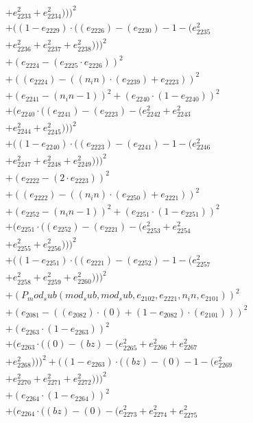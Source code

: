 \documentclass[10pt, a4paper]{article}
\begin{document}
\begin{small}
\begin{align*}
& + e_{2233}^{2} + e_{2234}^{2})))^{2} \\
& + ((1 - e_{2229})  \cdot  ((e_{2226}) - (e_{2230}) - 1 - (e_{2235}^{2} \\
& + e_{2236}^{2} + e_{2237}^{2} + e_{2238}^{2})))^{2} \\
& + (e_{2224} - (e_{2225}  \cdot  e_{2226}))^{2} \\
& + ((e_{2224}) - ((n_in)  \cdot  (e_{2239}) + e_{2223}))^{2} \\
& + (e_{2241} - (n_in - 1))^{2} + (e_{2240}  \cdot  (1 - e_{2240}))^{2} \\
& + (e_{2240}  \cdot  ((e_{2241}) - (e_{2223}) - (e_{2242}^{2} + e_{2243}^{2} \\
& + e_{2244}^{2} + e_{2245}^{2})))^{2} \\
& + ((1 - e_{2240})  \cdot  ((e_{2223}) - (e_{2241}) - 1 - (e_{2246}^{2} \\
& + e_{2247}^{2} + e_{2248}^{2} + e_{2249}^{2})))^{2} \\
& + (e_{2222} - (2  \cdot  e_{2223}))^{2} \\
& + ((e_{2222}) - ((n_in)  \cdot  (e_{2250}) + e_{2221}))^{2} \\
& + (e_{2252} - (n_in - 1))^{2} + (e_{2251}  \cdot  (1 - e_{2251}))^{2} \\
& + (e_{2251}  \cdot  ((e_{2252}) - (e_{2221}) - (e_{2253}^{2} + e_{2254}^{2} \\
& + e_{2255}^{2} + e_{2256}^{2})))^{2} \\
& + ((1 - e_{2251})  \cdot  ((e_{2221}) - (e_{2252}) - 1 - (e_{2257}^{2} \\
& + e_{2258}^{2} + e_{2259}^{2} + e_{2260}^{2})))^{2} \\
& + (P_mod_sub(mod_sub, mod_sub, e_{2102}, e_{2221}, n_in, e_{2101}))^{2} \\
& + (e_{2081} - ((e_{2082})  \cdot  (0) + (1 - e_{2082})  \cdot  (e_{2101})))^{2} \\
& + (e_{2263}  \cdot  (1 - e_{2263}))^{2} \\
& + (e_{2263}  \cdot  ((0) - (bz) - (e_{2265}^{2} + e_{2266}^{2} + e_{2267}^{2} \\
& + e_{2268}^{2})))^{2} + ((1 - e_{2263})  \cdot  ((bz) - (0) - 1 - (e_{2269}^{2} \\
& + e_{2270}^{2} + e_{2271}^{2} + e_{2272}^{2})))^{2} \\
& + (e_{2264}  \cdot  (1 - e_{2264}))^{2} \\
& + (e_{2264}  \cdot  ((bz) - (0) - (e_{2273}^{2} + e_{2274}^{2} + e_{2275}^{2} \\

\end{align*}
\end{small}
\end{document}
